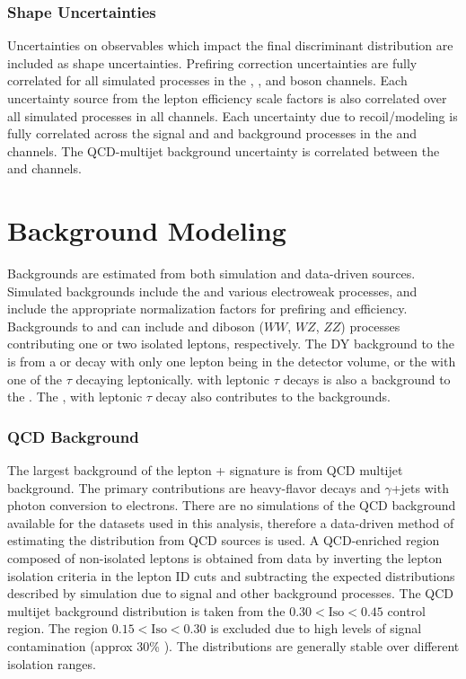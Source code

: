 \subsubsection{Shape Uncertainties}
Uncertainties on observables which impact the final discriminant distribution are included as shape uncertainties. Prefiring correction uncertainties are fully correlated for all simulated processes in the \Wp, \Wm, and \Z boson channels. Each uncertainty source from the lepton efficiency scale factors is also correlated over all simulated processes in all channels. Each uncertainty due to recoil/\met modeling is fully correlated across the \W signal and \W and \Z background processes in the \Wp and \Wm channels. The QCD-multijet background uncertainty is correlated between the \Wp and \Wm channels.

\section{Background Modeling}\label{ch:sig:bkg}
Backgrounds are estimated from both simulation and data-driven sources. Simulated backgrounds include the \ttbar and various electroweak processes, and include the appropriate normalization factors for prefiring and efficiency. Backgrounds to \W and \Z can include \ttbar and diboson ($WW$, $WZ$, $ZZ$) processes contributing one or two isolated leptons, respectively. The DY background to the \W is from a \zmm or \zee decay with only one lepton being in the detector volume, or the \ztt with one of the $\tau$ decaying leptonically. \ztt with leptonic $\tau$ decays is also a background to the \Z. The \wtaunu, with leptonic $\tau$ decay also contributes to the \W backgrounds.

 
\subsubsection{QCD Background}\label{ch:w:qcd}
The largest background of the \wlnu lepton + \met signature is from QCD multijet background. The primary contributions are heavy-flavor decays and $\gamma$+jets with photon conversion to electrons. 
There are no simulations of the QCD background available for the datasets used in this analysis, therefore a data-driven method of estimating the \mt distribution from QCD sources is used. A QCD-enriched region composed of non-isolated leptons is obtained from data by inverting the lepton isolation criteria in the lepton ID cuts and subtracting the expected \mt distributions described by simulation due to \W signal and other background processes. The QCD multijet background \mt distribution is taken from the $0.30 < \mathrm{Iso} < 0.45$ control region. The region $0.15 < \mathrm{Iso} < 0.30$ is excluded due to high levels of \W signal contamination (approx 30\% \W). The \mt distributions are generally stable over different isolation ranges.


